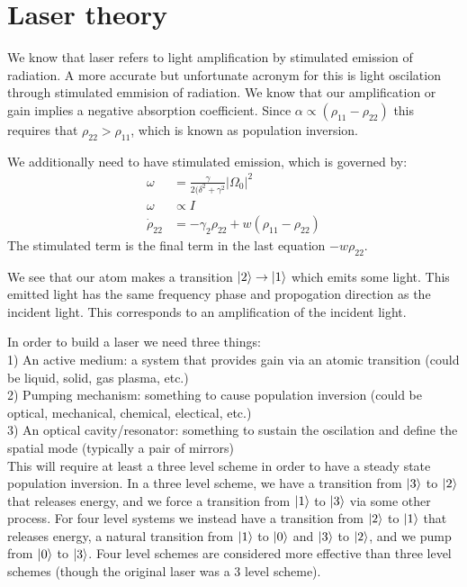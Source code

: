 \section{Laser theory}
We know that laser refers to light amplification by stimulated emission of radiation. A more accurate but unfortunate acronym for this is light oscilation through stimulated emmision of radiation.
We know that our amplification or gain implies a negative absorption coefficient. Since $\alpha \propto (\rho_{11} - \rho_{22})$ this requires that $\rho_{22} > \rho_{11}$, which is known as population inversion.

We additionally need to have stimulated emission, which is governed by:
\begin{align*}
	\omega &= \frac{\gamma}{2(\delta^2 +\gamma^2} |\Omega_0|^2 \\
	\omega &\propto I \\
	\dot{\rho}_{22} &= -\gamma_2 \rho_{22} + w(\rho_{11} - \rho_{22})
\end{align*}
The stimulated term is the final term in the last equation $-w\rho_{22}$.

We see that our atom makes a transition $\ket{2}\to\ket{1}$ which emits some light. This emitted light has the same frequency phase and propogation direction as the incident light.
This corresponds to an amplification of the incident light.

In order to build a laser we need three things:\\
1) An active medium: a system that provides gain via an atomic transition (could be liquid, solid, gas plasma, etc.) \\
2) Pumping mechanism: something to cause population inversion (could be optical, mechanical, chemical, electical, etc.) \\
3) An optical cavity/resonator: something to sustain the oscilation and define the spatial mode (typically a pair of mirrors) \\

This will require at least a three level scheme in order to have a steady state population inversion.
In a three level scheme, we have a transition from $\ket{3}$ to $\ket{2}$ that releases energy, and we force a transition from $\ket{1}$ to $\ket{3}$ via some other process.
For four level systems we instead have a transition from $\ket{2}$ to $\ket{1}$ that releases energy, a natural transition from $\ket{1}$ to $\ket{0}$ and $\ket{3}$ to $\ket{2}$, and we pump from $\ket{0}$ to $\ket{3}$.
Four level schemes are considered more effective than three level schemes (though the original laser was a 3 level scheme).


